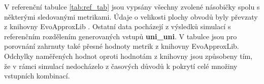 V referenční tabulce \ref{tab:ref_tab} jsou vypsány všechny zvolené násobičky spolu s některými sledovanými metrikami. Údaje o velikosti plochy obvodů byly převzaty z knihovny EvoApproxLib \cite{circuit_library}. Ostatní data pocházejí z výsledků simulací s referenčním rozdělením generovaných vstupů \textbf{uni\_uni}. V tabulce jsou pro porovnání zahrnuty také přesné hodnoty metrik z knihovny EvoApproxLib. Odchylky naměřených hodnot oproti hodnotám z knihovny jsou způsobeny tím, že v rámci simulací nedocházelo z časových důvodů k pokrytí celé množiny vstupních kombinací.

\begin{table}[H]
\end{table}
